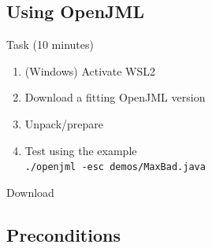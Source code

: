 
\subsection{Using OpenJML}

\begin{frame}{\insertsubsection}
	
	\begin{fancycolumns}
		
		\begin{definition}{Task (10 minutes)}
			
			\begin{enumerate}
				\item (Windows) Activate WSL2
				\item Download a fitting OpenJML version
				\item Unpack/prepare
				\item Test using the example \\ \texttt{./openjml -esc demos/MaxBad.java}
			\end{enumerate}
		\end{definition}
		
		\nextcolumn
		
		\begin{example}{Download}
			\centering{}
			
		\end{example}
		
	\end{fancycolumns}
\end{frame}

\subsection{Preconditions}

